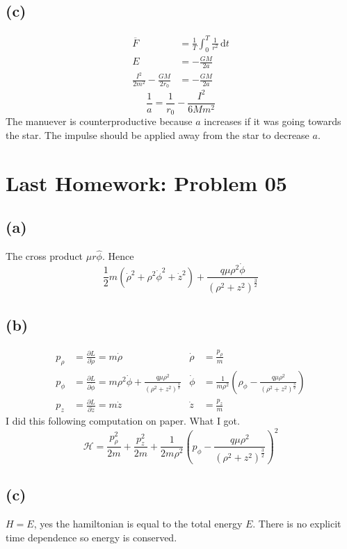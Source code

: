 \documentclass[letter, 10pts]{article}
\begin{document}
\subsection*{(c)} 
\begin{align*}
	\overline{F} &= \frac{1}{T} \int_{0}^{T} \frac{1}{r^2} \, \mathrm{d} t  \\
	E &= - \frac{GM}{2a} \\
	\frac{I^2}{2m^2} - \frac{GM}{2 r_0} &= - \frac{GM}{2a} 
\end{align*}
\[
\boxed{
\frac{1}{a} = \frac{1}{r_0} - \frac{I^2}{6Mm^2}
}
\] 
The manuever is counterproductive because $a$ increases if it was going towards the star. The impulse should be applied away from the star to decrease $a$.




\section*{Last Homework: Problem 05} 
\subsection*{(a)} 
The cross product $\mu r \hat{\phi}$. Hence
\[
\boxed{
	\frac{1}{2} m 
	\left(\dot \rho ^2 + \rho ^2 \dot{\phi}^2 + \dot{z}^2\right) + \frac{q \mu \rho^2 \dot{\phi}}{(\rho^2 + z^2)^{\frac{3}{2}}}
}
\] 


\subsection*{(b)} 
\begin{align*}
	p_\rho &= \frac{\partial L}{\partial \dot\rho} = m \dot{\rho} 
	       & \dot{\rho} &= \frac{p_\rho}{m} \\ 
	p_\phi &= \frac{\partial L}{\partial \dot{ \phi} } = m \rho^2 \dot{\phi}  + \frac{q \mu \rho^2}{(\rho^2 + z^2)^{\frac{3}{2}}} 
	       & \dot{\phi} &=  \frac{1}{m \rho^2 } \left(\rho_\phi - \frac{q \mu \rho^2 }{(\rho^2 + z^2)^{\frac{3}{2}}}\right)\\
	p_z &= \frac{\partial L}{\partial \dot{z}} = m \dot{z} 
	    &\dot{z} &= \frac{p_z}{m} 
\end{align*}
I did this following computation on paper. What I got. \[
\boxed{
\mathcal H = \frac{p_\rho^2}{2m} + \frac{p_z^2}{2m} + \frac{1}{2m \rho^2} 
\left(
p_\phi - \frac{q \mu \rho^2}{(\rho^2 + z^2)^{\frac{3}{2}}}
\right)^2
}
\] 

\subsection*{(c)} 
$H=E$, yes the hamiltonian is equal to the total energy $E$. There is no explicit time dependence so energy is conserved.
\end{document}
